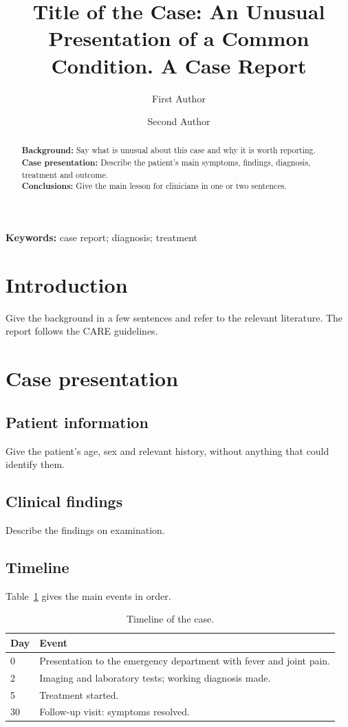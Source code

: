 \documentclass[11pt,a4paper]{article}
\title{Title of the Case: An Unusual Presentation of a Common Condition. A Case Report}
\author[1]{First Author}
\author[2]{Second Author}
\affil[1]{Department of Internal Medicine, University Hospital, City, Country}
\affil[2]{Department of Radiology, University Hospital, City, Country}
\date{}
\begin{document}
\maketitle

\begin{abstract}
\noindent\textbf{Background:} Say what is unusual about this case and why it is worth reporting.\\
\textbf{Case presentation:} Describe the patient's main symptoms, findings, diagnosis, treatment and outcome.\\
\textbf{Conclusions:} Give the main lesson for clinicians in one or two sentences.
\end{abstract}

\noindent\textbf{Keywords:} case report; diagnosis; treatment

\section{Introduction}
Give the background in a few sentences and refer to the relevant literature.
The report follows the CARE guidelines.\cite{gagnier2013care}

\section{Case presentation}
\subsection{Patient information}
Give the patient's age, sex and relevant history, without anything that could
identify them.

\subsection{Clinical findings}
Describe the findings on examination.

\subsection{Timeline}
Table~\ref{tab:timeline} gives the main events in order.

\begin{table}[htbp]
  \centering
  \caption{Timeline of the case.}
  \label{tab:timeline}
  \begin{tabular}{lp{10cm}}
    \toprule
    Day & Event \\
    \midrule
    0 & Presentation to the emergency department with fever and joint pain. \\
    2 & Imaging and laboratory tests; working diagnosis made. \\
    5 & Treatment started. \\
    30 & Follow-up visit: symptoms resolved. \\
    \bottomrule
  \end{tabular}
\end{table}
\end{document}
